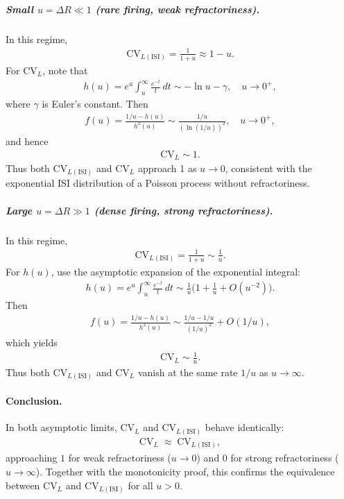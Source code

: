 \documentclass[11pt]{article}
\theoremstyle{remark}
\theoremstyle{definition}
\begin{document}
\subparagraph{Small $u=\Delta R \ll 1$ (rare firing, weak refractoriness).}
In this regime,
\begin{align}
\mathrm{CV}_{L(\mathrm{ISI})} = \frac{1}{1+u} \approx 1 - u.
\end{align}
For $\mathrm{CV}_L$, note that
\begin{align}
h(u) = e^u \int_u^\infty \frac{e^{-t}}{t}\,dt \sim -\ln u - \gamma, \quad u\to 0^+,
\end{align}
where $\gamma$ is Euler’s constant. Then
\begin{align}
f(u) = \frac{1/u - h(u)}{h^2(u)} \sim \frac{1/u}{(\ln(1/u))^2}, \quad u\to 0^+,
\end{align}
and hence
\begin{align}
\mathrm{CV}_L \sim 1.
\end{align}
Thus both $\mathrm{CV}_{L(\mathrm{ISI})}$ and $\mathrm{CV}_L$ approach 1 as $u\to 0$, consistent with the exponential ISI distribution of a Poisson process without refractoriness.

\subparagraph{Large $u=\Delta R \gg 1$ (dense firing, strong refractoriness).}
In this regime,
\begin{align}
\mathrm{CV}_{L(\mathrm{ISI})} = \frac{1}{1+u} \sim \frac{1}{u}.
\end{align}
For $h(u)$, use the asymptotic expansion of the exponential integral:
\begin{align}
h(u) = e^u \int_u^\infty \frac{e^{-t}}{t}\,dt \sim \frac{1}{u}\Big(1 + \frac{1}{u} + O(u^{-2})\Big).
\end{align}
Then
\begin{align}
f(u) = \frac{1/u - h(u)}{h^2(u)} \sim \frac{1/u - 1/u}{(1/u)^2} + O(1/u),
\end{align}
which yields
\begin{align}
\mathrm{CV}_L \sim \frac{1}{u}.
\end{align}
Thus both $\mathrm{CV}_{L(\mathrm{ISI})}$ and $\mathrm{CV}_L$ vanish at the same rate $1/u$ as $u\to\infty$.

\paragraph{Conclusion.}
In both asymptotic limits, $\mathrm{CV}_L$ and $\mathrm{CV}_{L(\mathrm{ISI})}$ behave identically:
\begin{align}
\mathrm{CV}_L \;\approx\; \mathrm{CV}_{L(\mathrm{ISI})},
\end{align}
approaching $1$ for weak refractoriness ($u\to 0$) and $0$ for strong refractoriness ($u\to\infty$). Together with the monotonicity proof, this confirms the equivalence between $\mathrm{CV}_L$ and $\mathrm{CV}_{L(\mathrm{ISI})}$ for all $u>0$.
\end{document}
